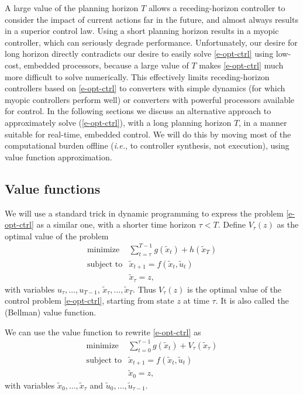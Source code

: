 \documentclass[12pt]{article}
\newcommand{\ie}{{\it i.e.}}
\begin{document}
A large value of the planning horizon $T$ allows a receding-horizon controller
to consider the impact of current actions far in the future,
and almost always results in a superior control law.
Using a short planning horizon results in a myopic controller,
which can seriously degrade performance. 
Unfortunately, our desire for long horizon directly contradicts
our desire to easily solve \eqref{e-opt-ctrl} using low-cost, embedded processors,
because a large value of $T$ makes \eqref{e-opt-ctrl} much more difficult to solve numerically.
This effectively limits receding-horizon controllers based on \eqref{e-opt-ctrl}
to converters with simple dynamics 
(for which myopic controllers perform well)
or converters with powerful processors available for control.
In the following sections we discuss an alternative approach 
to approximately solve (\ref{e-opt-ctrl}), 
with a long planning horizon $T$,
in a manner suitable for real-time, embedded control.
We will do this by moving most of the computational burden offline
(\ie, to controller synthesis, not execution),
using value function approximation.


\subsection{Value functions}
\label{s-value-functions}

We will use a standard trick in dynamic programming to express
the problem \eqref{e-opt-ctrl} as a similar one, with a shorter
time horizon $\tau<T$.
Define $V_\tau(z)$ as the optimal value of the problem
\begin{equation}
\label{e-value}
\begin{array}{ll}
\mbox{minimize} & 
  \sum_{t=\tau}^{T-1} g(\tilde x_t) + h(\tilde x_T) \\
\mbox{subject to} & \tilde x_{t+1} = f(\tilde x_t, \tilde u_t) \\
                  & \tilde x_\tau = z,
\end{array}
\end{equation}
with variables 
$u_\tau, \ldots, u_{T-1}$, $\tilde x_\tau, \ldots, \tilde x_T$.
Thus $V_\tau(z)$ is the optimal value of the control 
problem \eqref{e-opt-ctrl},
starting from state $z$ at time $\tau$.
It is also called the (Bellman) value function.



We can use the value function to rewrite \eqref{e-opt-ctrl} as
\begin{equation}
\label{e-one-step-policy}
\begin{array}{ll}
\mbox{minimize} & 
  \sum_{t=0}^{\tau - 1} g(\tilde x_t) + V_\tau(\tilde x_\tau) \\
\mbox{subject to} & \tilde x_{t+1} = f(\tilde x_t, \tilde u_t) \\
                  & \tilde x_0 = z,
\end{array}
\end{equation}
with variables $\tilde x_0, \dots, \tilde x_{\tau}$ and 
$\tilde u_0, \dots, \tilde u_{\tau-1}$.
\end{document}

